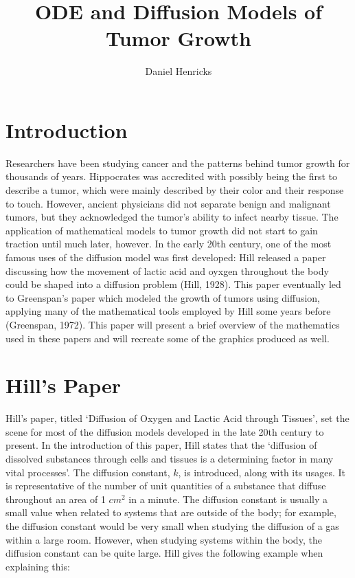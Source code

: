 \documentclass{article}
\title{ODE and Diffusion Models of Tumor Growth}
\author{Daniel Henricks}
\begin{document}
\maketitle

\section{Introduction}

Researchers have been studying cancer and the patterns behind tumor growth for thousands of years. Hippocrates
was accredited with possibly being the first to describe a tumor, which were mainly described by their color
and their response to touch. However, ancient physicians did not separate benign and malignant tumors, but they
acknowledged the tumor's ability to infect nearby tissue. The application of mathematical models to tumor growth
did not start to gain traction until much later, however. In the early 20th century, one of the most famous uses of
the diffusion model was first developed: Hill released a paper discussing how the movement of lactic acid
and oyxgen throughout the body could be shaped into a diffusion problem (Hill, 1928). This paper eventually led to
Greenspan's paper which modeled the growth of tumors using diffusion, applying many of the mathematical tools employed
by Hill some years before (Greenspan, 1972). This paper will present a brief overview of the mathematics used in these
papers and will recreate some of the graphics produced as well.

\section{Hill's Paper}

Hill's paper, titled `Diffusion of Oxygen and Lactic Acid through Tissues', set the scene for most of the diffusion models
developed in the late 20th century to present. In the introduction of this paper, Hill states that the
`diffusion of dissolved substances through cells and tissues is a determining factor in many vital processes'.
The diffusion constant, $k$, is introduced, along with its usages. It is representative of the number of unit quantities
of a substance that diffuse throughout an area of 1 $cm^2$ in a minute. The diffusion constant is usually a small value
when related to systems that are outside of the body; for example, the diffusion constant would be very small when studying
the diffusion of a gas within a large room. However, when studying systems within the body, the diffusion constant can be quite large.
Hill gives the following example when explaining this:
\end{document}
